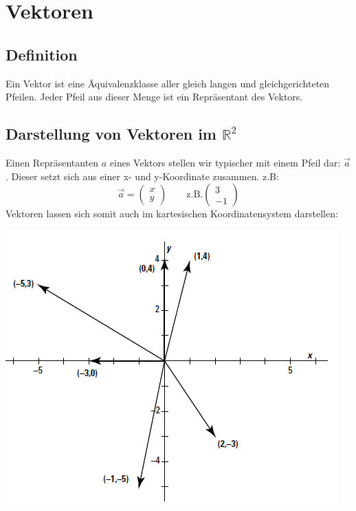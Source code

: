 \chapter{Vektoren}
\section{Definition}
\begin{mydef}Ein Vektor ist eine Äquivalenzklasse aller gleich langen und gleichgerichteten Pfeilen. Jeder Pfeil aus dieser Menge ist ein Repräsentant des Vektors.\end{mydef}
\section{Darstellung von Vektoren im $\mathbb{R}^2$}
Einen Repräsentanten $a$ eines Vektors stellen wir typischer mit einem Pfeil dar: $\vec{a}$. Dieser setzt sich aus einer x- und y-Koordinate zusammen. z.B:
\begin{equation*}
\vec{a} = \begin{pmatrix}x\\y \end{pmatrix} \quad\quad\mbox{z.B.} \begin{pmatrix}3\\-1 \end{pmatrix}
\end{equation*}
Vektoren lassen sich somit auch im kartesischen Koordinatensystem darstellen:
\begin{center}\includegraphics[scale=1]{imgs/Vektor1.png}\end{center}
